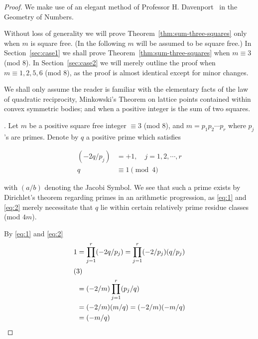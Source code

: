 \begin{proof}
\leanok

We make use of an elegant method of Professor H. Davenport~\cite{Davenport1947} in the Geometry of Numbers.

Without loss of generality we will prove Theorem~\ref{thm:sum-three-squares} only when $m$ is square free. (In the following $m$ will be assumed to be square free.)
In Section~\ref{sec:case1} we shall prove Theorem~\ref{thm:sum-three-squares} when $m\equiv3$ (mod 8). In Section~\ref{sec:case2} we will merely outline the proof when $m\equiv1, 2, 5, 6$ (mod 8), as the proof is almost identical except for minor changes.

We shall only assume the reader is familiar with the elementary facts of the law of quadratic reciprocity, Minkowski's Theorem on lattice points contained within convex symmetric bodies; and when a positive integer is the sum of two squares.

{}
\label{sec:case1}
. Let $m$ be a positive square free integer $\equiv3$ (mod 8), and $m=p_{1}p_{2}\cdots p_{r}$ where $p_{j}$'s are primes.
Denote by $q$ a positive prime which satisfies

\begin{align}
\label{eq:1} \tag{1}
(-2q/p_{j})&=+1, \quad j=1, 2, \cdots, r \\
\label{eq:2} \tag{2}
q&\equiv1 \pmod{4}
\end{align}

with $(a/b)$ denoting the Jacobi Symbol. We see that such a prime exists by Dirichlet's theorem regarding primes in an arithmetic progression,
as \eqref{eq:1} and \eqref{eq:2} merely necessitate that $q$ lie within certain relatively prime residue classes (mod $4m$).

By \eqref{eq:1} and \eqref{eq:2}
\begin{align*}
1&=\prod_{j=1}^{r}(-2q/p_{j})=\prod_{j=1}^{r}(-2/p_{j})(q/p_{j}) \\
\intertext{(3)}
&=(-2/m)\prod_{j=1}^{r}(p_{j}/q) \\
&=(-2/m)(m/q)=(-2/m)(-m/q) \\
&=(-m/q)
\end{align*}


\end{proof}
